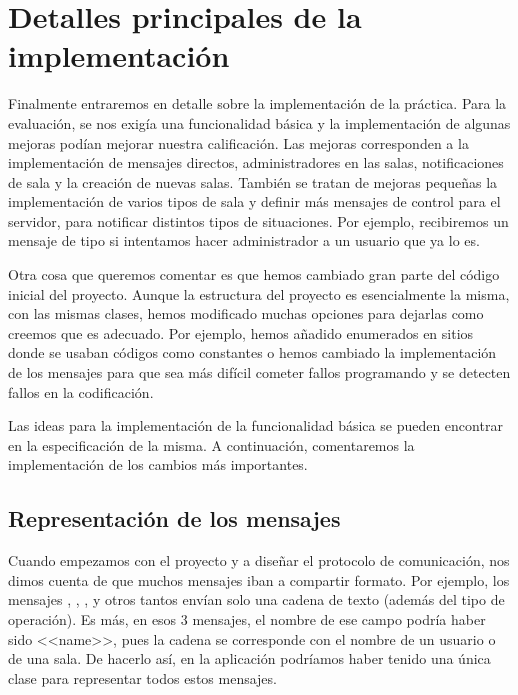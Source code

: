 \section{Detalles principales de la implementación} 
Finalmente entraremos en detalle sobre la implementación de la práctica. Para la evaluación, se nos exigía una funcionalidad básica y la implementación de algunas mejoras podían mejorar nuestra calificación. Las mejoras corresponden a la implementación de mensajes directos, administradores en las salas, notificaciones de sala y la creación de nuevas salas. También se tratan de mejoras pequeñas la implementación de varios tipos de sala y definir más mensajes de control para el servidor, para notificar distintos tipos de situaciones. Por ejemplo, recibiremos un mensaje de tipo  si intentamos hacer administrador a un usuario que ya lo es.

Otra cosa que queremos comentar es que hemos cambiado gran parte del código inicial del proyecto. Aunque la estructura del proyecto es esencialmente la misma, con las mismas clases, hemos modificado muchas opciones para dejarlas como creemos que es adecuado. Por ejemplo, hemos añadido enumerados en sitios donde se usaban códigos como constantes o hemos cambiado la implementación de los mensajes para que sea más difícil cometer fallos programando y se detecten fallos en la codificación.

Las ideas para la implementación de la funcionalidad básica se pueden encontrar en la especificación de la misma. A continuación, comentaremos la implementación de los cambios más importantes.

\subsection{Representación de los mensajes} %
Cuando empezamos con el proyecto y a diseñar el protocolo de comunicación, nos dimos cuenta de que muchos mensajes iban a compartir formato. Por ejemplo, los mensajes , , , y otros tantos envían solo una cadena de texto (además del tipo de operación). Es más, en esos $3$ mensajes, el nombre de ese campo podría haber sido <<name>>, pues la cadena se corresponde con el nombre de un usuario o de una sala. De hacerlo así, en la aplicación podríamos haber tenido una única clase para representar todos estos mensajes.

